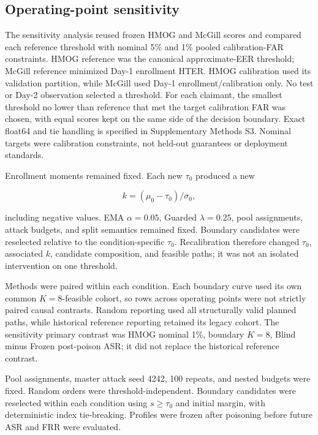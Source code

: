 \documentclass[technologies,article,submit,moreauthors]{Definitions/mdpi}
\begin{document}
\subsection{Operating-point sensitivity}\label{sec:operating-point-sensitivity}

The sensitivity analysis reused frozen HMOG and McGill scores and compared each reference threshold with nominal 5\% and 1\% pooled calibration-FAR constraints. HMOG reference was the canonical approximate-EER threshold; McGill reference minimized Day-1 enrollment HTER. HMOG calibration used its validation partition, while McGill used Day-1 enrollment/calibration only. No test or Day-2 observation selected a threshold. For each claimant, the smallest threshold no lower than reference that met the target calibration FAR was chosen, with equal scores kept on the same side of the decision boundary. Exact float64 and tie handling is specified in Supplementary Methods S3. Nominal targets were calibration constraints, not held-out guarantees or deployment standards.

Enrollment moments remained fixed. Each new \(\tau_0\) produced a new

\[
k=(\mu_0-\tau_0)/\sigma_0,
\]

including negative values. EMA \(\alpha=0.05\), Guarded \(\lambda=0.25\), pool assignments, attack budgets, and split semantics remained fixed. Boundary candidates were reselected relative to the condition-specific \(\tau_0\). Recalibration therefore changed \(\tau_0\), associated \(k\), candidate composition, and feasible paths; it was not an isolated intervention on one threshold.

Methods were paired within each condition. Each boundary curve used its own common \(K=8\)-feasible cohort, so rows across operating points were not strictly paired causal contrasts. Random reporting used all structurally valid planned paths, while historical reference reporting retained its legacy cohort. The sensitivity primary contrast was HMOG nominal 1\%, boundary \(K=8\), Blind minus Frozen post-poison ASR; it did not replace the historical reference contrast.

Pool assignments, master attack seed 4242, 100 repeats, and nested budgets were fixed. Random orders were threshold-independent. Boundary candidates were reselected within each condition using \(s\geq\tau_0\) and initial margin, with deterministic index tie-breaking. Profiles were frozen after poisoning before future ASR and FRR were evaluated.
\end{document}
